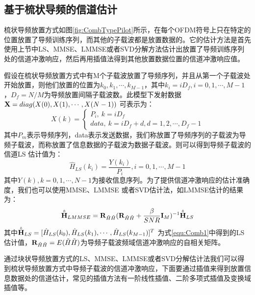 \subsection{基于梳状导频的信道估计}
梳状导频放置方式如图\ref{fig:CombTypePilot}所示，在每个OFDM符号上只在特定的位置放置了导频训练序列，而其他的子载波都是放置数据的。它的估计方法是首先使用上节中LS、MMSE、LMMSE或者SVD分解方法估计出放置了导频训练序列处的信道冲激响应，然后再用插值法得到其他放置数据位置的信道冲激响应值。

假设在梳状导频放置方式中有M个子载波放置了导频序列，并且从第一个子载波处开始放置，则他们放置的位置为$k_0,k_1,\cdots,k_{M-1}$，其中$k_i=iD_f, i=0,1,\cdots,M-1$，$D_f=N/M$为导频放置间隔子载波数。此模型下发射数据$\textbf X=diag(X(0),X(1),\cdots,X(N-1))$ 可表示为：
\begin{equation}
X(k)=
\begin{cases}
P_i, \ k=iD_f \\
data, \ k=iD_f+d, d=1,2,\cdots,D_f-1
\end{cases}
\end{equation}
其中$P_m$表示导频序列，data表示发送数据，我们称放置了导频序列的子载波为导频子载波，而称放置了信息数据的子载波为数据子载波。则可以得到导频子载波的信道LS 估计值为：
\begin{equation}
\hat{H}_{LS}(k_i) = \frac{Y(k_i)}{P_i}, i=0,1,\cdots,M-1
\label{equ:Comb1}
\end{equation}
其中$Y(k),k=0,1,\cdots,N-1$为接收信息序列。为了提供信道冲激响应的估计准确度，我们也可以使用MMSE、LMMSE 或者SVD估计法，如LMMSE估计的结果为：
\begin{equation}
\hat{\tilde{\textbf H}}_{LMMSE}=\textbf R_{\tilde{H}\tilde{H}}(\textbf R_{\tilde{H}\tilde{H}}+\frac{\beta}{SNR}\textbf I_M)^{-1}\hat{\tilde{\textbf H}}_{LS}
\end{equation}
其中$\hat{\tilde{\textbf H}}_{LS}=[\hat{H}_{LS}(k_0),\hat{H}_{LS}(k_1),\cdots,\hat{H}_{LS}(k_{M-1})]^T$ 为式\ref{equ:Comb1}中得到的LS估计值，$\textbf R_{\tilde{H}\tilde{H}}=E(\tilde{H}\tilde{H})$为导频子载波频域信道冲激响应的自相关矩阵。

通过块状导频放置方式的LS、MMSE、LMMSE或者SVD分解估计法我们可以得到梳状导频放置方式中导频子载波的信道冲激响应，下面要通过插值来得到放置信息数据处的信道估计，常见的插值方法有一阶线性插值、二阶多项式插值及变换域插值等。
